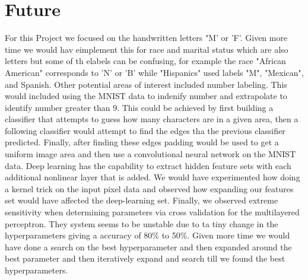 \section{Future}

For this Project we focused on the handwritten letters "M' or 'F'.  Given more time we would hav eimplement this for race and marital status which are also letters but some of th elabels can be confusing, for example the race "African American" corresponds to 'N' or 'B' while "Hispanics" used labels "M", "Mexican", and Spanish.
Other potential areas of interest included number labeling.  This would included using the MNIST data to indenify number and extrapolate to identify number greater than 9.  This could be achieved by first building a classifier that attempts to guess how many characters are in a given area, then a following classifier would attempt to find the edges tha the previous classifier predicted.  Finally, after finding these edges padding would be used to get a uniform image area and then use a convolutional neural network on the MNIST data.
Deep learning has the capability to extract hidden feature sets with each additional nonlinear layer that is added.  We would have experimented how doing a kernel trick on the input pixel data and observed how expanding our features set would have affected the deep-learning set.
Finally, we observed extreme sensitivity when determining parameters via cross validation for the multilayered perceptron.  They system seems to be unstable due to ta tiny change in the hyperparameters giving a accuracy of 80\% to 50\%.  Given more time we would have done a search on the best hyperparameter and then expanded around the best parameter and then iteratively expand and search till we found the best hyperparameters.
